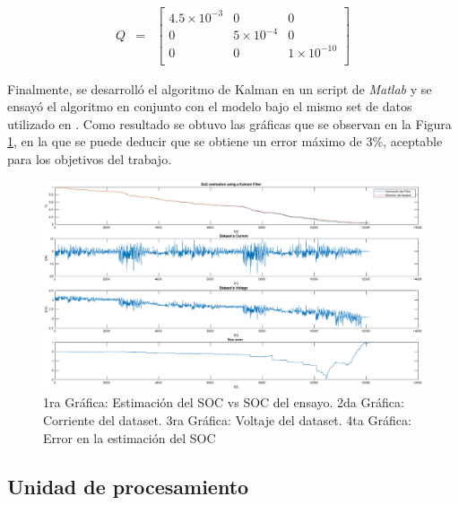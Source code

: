 \documentclass[10pt,a4paper]{article}
\begin{document}
\begin{equation}
    \begin{array}{llll}
	Q & = & \begin{bmatrix}
	    4.5\times10^{-3} & 0 & 0 \\
	    0 & 5\times10^{-4} & 0 \\
	    0 & 0 & 1\times10^{-10} \\
	\end{bmatrix} 
    \end{array} \nonumber
\end{equation}

Finalmente, se desarroll\'o el algoritmo de Kalman en un script de \emph{Matlab}
y se ensay\'o el algoritmo en conjunto con el modelo bajo el mismo set de datos
utilizado en \label{ensayo_HPPC}. Como resultado se obtuvo las gr\'aficas que se
observan en la Figura \ref{kalman_result_matlab}, en la que se puede deducir que
se obtiene un error m\'aximo de 3\%, aceptable para los objetivos del trabajo.

\begin{figure}[h!]
    \begin{center}
        \includegraphics[width=1\textwidth]{kalman_result_matlab.eps}
        \caption{1ra Gr\'afica: Estimaci\'on del \acrshort{SOC} vs
        \acrshort{SOC} del ensayo. 2da Gr\'afica: Corriente del dataset. 3ra
        Gr\'afica: Voltaje del dataset. 4ta Gr\'afica: Error en la estimaci\'on
        del \acrshort{SOC}} 
        \label{kalman_result_matlab}
    \end{center}
\end{figure}

\newpage

\subsection{Unidad de procesamiento}
\end{document}
